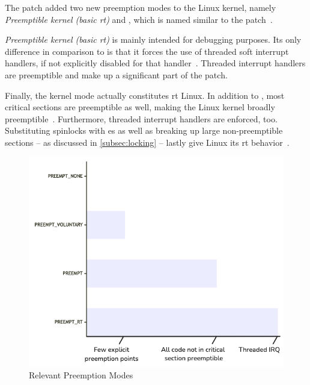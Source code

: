 \documentclass[10pt,twocolumn,a4paper]{article}
\begin{document}
\noindent The  patch added two new preemption modes to the Linux kernel, namely \emph{Preemptible kernel (basic \acrshort{rt})} and , which is named similar to the patch~\cite{lf:preemption,kernel_preemption_modes}.

\emph{Preemptible kernel (basic \acrshort{rt})} is mainly intended for debugging purposes.
Its only difference in comparison to  is that it forces the use of threaded soft interrupt handlers, if not explicitly disabled for that handler~\cite{lf:preemption}.
Threaded interrupt handlers are preemptible and make up a significant part of the  patch.

Finally, the  kernel mode actually constitutes \acrshort{rt} Linux.
In addition to , most critical sections are preemptible as well, making the Linux kernel broadly preemptible~\cite{lf:preemption}.
Furthermore, threaded interrupt handlers are enforced, too.
Substituting spinlocks with es as well as breaking up large non-preemptible sections -- as discussed in \autoref{subsec:locking} -- lastly give Linux its \acrshort{rt} behavior~\cite{lf:preemption}.

\begin{figure}[htb]
  \centering
  \includegraphics[scale=.36, clip]{assets/preemption_modes.png}
  \caption{Relevant Preemption Modes}
\end{figure}
\end{document}
